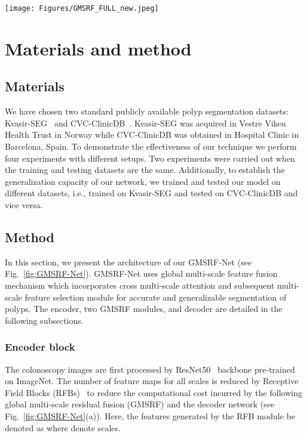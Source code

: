 \documentclass[conference]{IEEEtran}
\begin{document}
\begin{figure*}[!t]
    \centering
    \texttt{[image: Figures/GMSRF\_FULL\_new.jpeg]}
    \caption{The proposed GMSRF-Net architecture, a) The GMSRF-Net architecture (left), b) The GMSRF module (right)}
    \label{fig:GMSRF-Net}
\end{figure*}
\section{Materials and method}
\subsection{Materials}
We have chosen two standard publicly available polyp segmentation datasets: Kvasir-SEG~\cite{jha2020kvasir} and CVC-ClinicDB~\cite{bernal2015wm}. Kvasir-SEG was acquired in Vestre Viken Health Trust in Norway while CVC-ClinicDB was obtained in Hospital Clinic in Barcelona, Spain. To demonstrate the effectiveness of our technique we perform four experiments with different setups. Two experiments were carried out when the training and testing datasets are the same. Additionally, to establish the generalization capacity of our network, we trained and tested our model on different datasets, i.e., trained on Kvasir-SEG and tested on CVC-ClinicDB and vice versa.
\subsection{Method}
In this section, we present the architecture of our GMSRF-Net (see Fig.~\ref{fig:GMSRF-Net}). GMSRF-Net uses global multi-scale feature fusion mechanism which incorporates cross multi-scale attention and subsequent multi-scale feature selection module for accurate and generalizable segmentation of polyps. The encoder, two GMSRF modules, and decoder are detailed in the following subsections.
\subsubsection{Encoder block}
The colonoscopy images are first processed by ResNet50~\cite{he2016deep} backbone pre-trained on ImageNet. The number of feature maps for all scales is reduced by Receptive Field Blocks (RFBs)~\cite{liu2018receptive} to reduce the computational cost incurred by the following global multi-scale residual fusion (GMSRF) and the decoder network (see Fig.~\ref{fig:GMSRF-Net}(a)). Here, the features generated by the RFB module be denoted as  where  denote scales.
\end{document}

